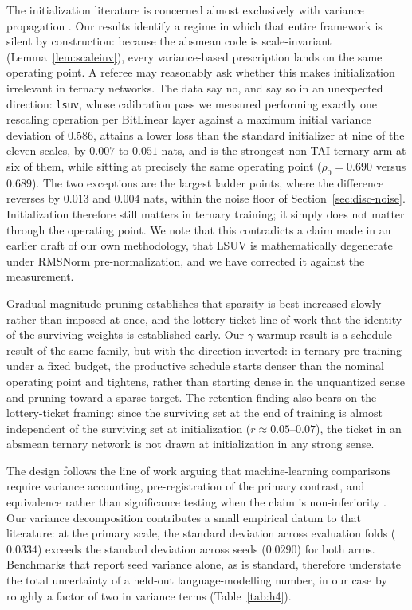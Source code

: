 \documentclass[final,5p,times,twocolumn]{elsarticle}
\theoremstyle{remark}
\newcommand{\rhoz}{\rho_{0}}
\begin{document}
The initialization literature is concerned almost
exclusively with variance propagation \cite{glorot2010,he2015,mishkin2016}. Our results identify a regime in which that entire framework
is silent by construction: because the absmean code is scale-invariant
(Lemma~\ref{lem:scaleinv}), every variance-based prescription lands on the same
operating point. A referee may reasonably ask whether this makes
initialization irrelevant in ternary networks. The data say no, and say so in
an unexpected direction: \texttt{lsuv}, whose calibration pass we measured
performing
exactly one rescaling operation per BitLinear layer against a maximum
initial variance deviation of $0.586$, attains a lower loss than the standard
initializer at nine of the eleven scales, by $0.007$ to $0.051$ nats, and is
the strongest non-TAI ternary arm at six of them, while sitting at precisely
the same operating point ($\rhoz = 0.690$ versus $0.689$). The two exceptions
are the largest ladder points, where the difference reverses by $0.013$ and
$0.004$ nats, within the noise floor of Section~\ref{sec:disc-noise}.
Initialization therefore still matters in ternary training; it simply does not
matter through the operating point. We note that this contradicts a
claim made in an earlier draft of our own methodology, that LSUV is
mathematically degenerate under RMSNorm pre-normalization, and we have
corrected it against the measurement.

Gradual magnitude pruning
\cite{zhu2017b} establishes that sparsity is best increased slowly rather
than imposed at once, and the lottery-ticket line of work
\cite{frankle2019} that the identity of the surviving weights is
established early. Our $\gamma$-warmup result is a schedule result of the same
family, but with the direction inverted: in ternary pre-training under a fixed
budget, the productive schedule starts denser than the nominal operating
point and tightens, rather than starting dense in the unquantized sense and
pruning toward a sparse target. The retention finding also bears on the
lottery-ticket framing: since the surviving set at the end of training is
almost independent of the surviving set at initialization
($r \approx 0.05$--$0.07$), the ticket in an absmean ternary network is not
drawn at initialization in any strong sense.

The design follows the line of work arguing
that machine-learning comparisons require variance accounting, pre-registration
of the primary contrast, and equivalence rather than significance testing when
the claim is non-inferiority \cite{melis2018,lucic2018,dodge2019,bouthillier2021,lakens2017,holm1979}. Our
variance decomposition contributes a small empirical datum to that literature:
at the primary scale, the standard deviation across evaluation folds
($0.0334$) exceeds the standard deviation across seeds ($0.0290$) for both
arms. Benchmarks that report seed variance alone, as is standard, therefore
understate the total uncertainty of a held-out language-modelling number, in
our case by roughly a factor of two in variance terms
(Table~\ref{tab:h4}).
\end{document}
